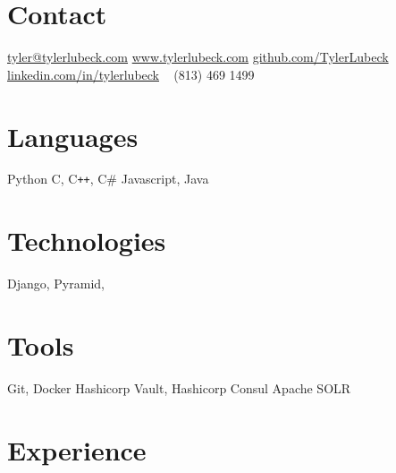 \documentclass[print]{friggeri-cv} %
\begin{document}


\begin{aside} %
\section{Contact}
\href{mailto:tyler@tylerlubeck.com}{tyler@tylerlubeck.com}
\href{https://www.tylerlubeck.com}{www.tylerlubeck.com}
\href{https://www.github.com/TylerLubeck}{github.com/TylerLubeck}
\href{https://www.linkedin.com/in/tylerlubeck}{linkedin.com/in/tylerlubeck}
~
(813) 469 1499
\section{Languages}
Python
C, C{}\texttt{++}, C\#
Javascript, Java
\section{Technologies}
Django, Pyramid,
\section{Tools}
Git, Docker
Hashicorp Vault, Hashicorp Consul
Apache SOLR
\end{aside}


\section{Experience}
\end{document}
